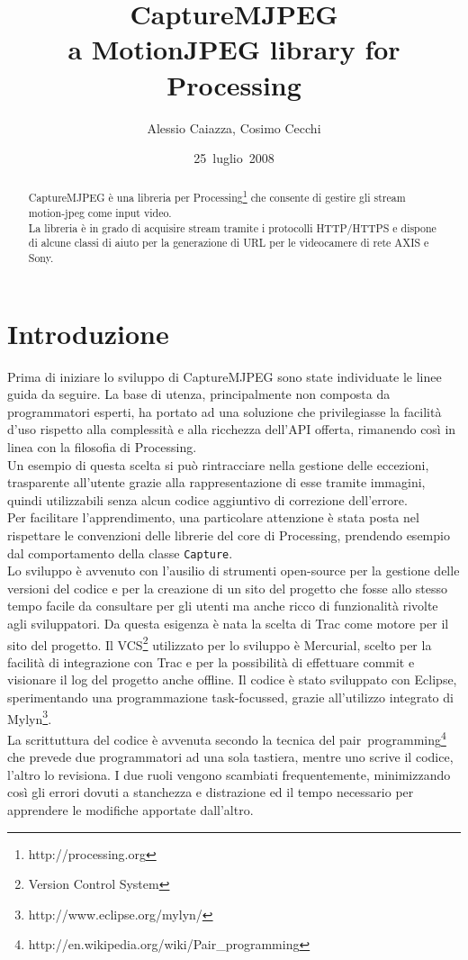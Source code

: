 \documentclass[a4paper,11pt]{article}
\author{Alessio Caiazza, Cosimo Cecchi}
\title{\textbf{CaptureMJPEG}\\ a MotionJPEG library for Processing}
\date{25~luglio~2008}
\begin{document}
\maketitle

\newcommand{\reffigura}[1]{
  Figura \ref{#1}
}

\begin{abstract}
CaptureMJPEG è una libreria per
Processing\footnote{http://processing.org} che consente di gestire gli
stream motion-jpeg come input video.\\
La libreria è in grado di acquisire stream tramite i protocolli
\mbox{HTTP/HTTPS} e dispone di alcune classi di aiuto per la 
generazione di URL per le videocamere di rete AXIS e Sony.  
\end{abstract}
\tableofcontents


\section{Introduzione}
\label{sec:introduzione}
Prima di iniziare lo sviluppo di CaptureMJPEG sono state individuate
le linee guida da seguire.
La base di utenza, principalmente non composta da programmatori esperti,
ha portato ad una soluzione che privilegiasse la facilit\`a d'uso
rispetto alla complessit\`a e alla ricchezza dell'API offerta,
rimanendo così in linea con la filosofia di Processing.\\
Un esempio di questa scelta si pu\`o rintracciare nella gestione delle
eccezioni, trasparente all'utente grazie alla rappresentazione di esse
tramite immagini, quindi utilizzabili senza alcun codice aggiuntivo di
correzione dell'errore.\\
Per facilitare l'apprendimento, una particolare attenzione \`e stata
posta nel rispettare le convenzioni delle librerie del core di
Processing, prendendo esempio dal comportamento della classe
\texttt{Capture}.\\
Lo sviluppo è avvenuto con l'ausilio di strumenti open-source per la
gestione delle versioni del codice e per la creazione di un sito del 
progetto che fosse allo stesso tempo facile da consultare per gli utenti ma
anche ricco di funzionalit\`a rivolte agli sviluppatori. Da questa
esigenza \`e nata la scelta di Trac come motore per il sito del
progetto. Il VCS\footnote{Version Control System} utilizzato per lo
sviluppo \`e Mercurial, scelto per la facilit\`a di integrazione con 
Trac e per la possibilit\`a di effettuare commit e visionare il log
del progetto anche offline.
Il codice \`e stato sviluppato con Eclipse, sperimentando una 
programmazione task-focussed, grazie all'utilizzo integrato di
Mylyn\footnote{http://www.eclipse.org/mylyn/}.\\
La scrittuttura del codice è avvenuta secondo la tecnica del
pair~programming\footnote{http://en.wikipedia.org/wiki/Pair\_programming}
che prevede due programmatori ad una sola tastiera, mentre uno scrive
il codice, l'altro lo revisiona. I due ruoli vengono scambiati
frequentemente, minimizzando così gli errori dovuti a stanchezza e
distrazione ed il tempo necessario per apprendere le modifiche
apportate dall'altro.
\end{document}
